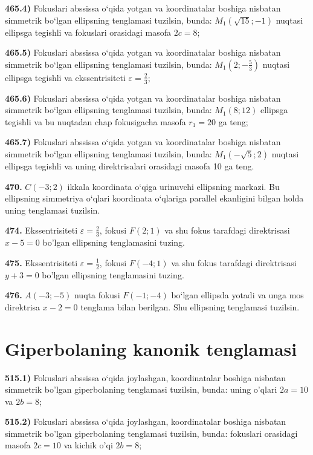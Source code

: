 \textbf{465.4)} Fokuslari abssissa o‘qida yotgan va koordinatalar boshiga nisbatan simmetrik bo‘lgan ellipsning tenglamasi tuzilsin, bunda: $M_1(\sqrt{15} ;-1)$ nuqtasi ellipsga tegishli va fokuslari orasidagi masofa $2 c=8$;

\textbf{465.5)} Fokuslari abssissa o‘qida yotgan va koordinatalar boshiga nisbatan simmetrik bo‘lgan ellipsning tenglamasi tuzilsin, bunda: $M_1\left(2 ;-\frac{5}{3}\right)$ nuqtasi ellipsga tegishli va ekssentrisiteti $\varepsilon=\frac{2}{3}$;

\textbf{465.6)} Fokuslari abssissa o‘qida yotgan va koordinatalar boshiga nisbatan simmetrik bo‘lgan ellipsning tenglamasi tuzilsin, bunda: $M_1(8 ; 12)$ ellipsga tegishli va bu nuqtadan chap fokusigacha masofa $r_1=20$ ga teng;

\textbf{465.7)} Fokuslari abssissa o‘qida yotgan va koordinatalar boshiga nisbatan simmetrik bo‘lgan ellipsning tenglamasi tuzilsin, bunda: $M_1 (-\sqrt{5}; 2) $ nuqtasi ellipsga tegishli va uning direktrisalari orasidagi masofa 10 ga teng.

\textbf{470.} $C (-3; 2) $ ikkala koordinata o‘qiga urinuvchi ellipsning markazi. Bu ellipsning simmetriya o‘qlari koordinata o‘qlariga parallel ekanligini bilgan holda uning tenglamasi tuzilsin.

\textbf{474.} Ekssentrisiteti $\varepsilon=\frac{2}{3}$, fokusi $F(2 ; 1)$ va shu fokus tarafdagi direktrisasi $x-5=0$ bo'lgan ellipsning tenglamasini tuzing.

\textbf{475.} Ekssentrisiteti $\varepsilon=\frac{1}{2}$, fokusi $F(-4 ; 1)$ va shu fokus tarafdagi direktrisasi $y+3=0$ bo'lgan ellipsning tenglamasini tuzing.

\textbf{476.} $A (-3;-5)$ nuqta fokusi $F (-1;-4)$ bo‘lgan ellipsda yotadi va unga mos direktrisa $x-2=0$ tenglama bilan berilgan. Shu ellipsning tenglamasi tuzilsin.



\section{Giperbolaning kanonik tenglamasi}



\textbf{515.1)} Fokuslari abssissa o‘qida joylashgan, koordinatalar boshiga nisbatan simmetrik bo'lgan giperbolaning tenglamasi tuzilsin, bunda: uning o'qlari $2 a=10$ va $2 b=8$;

\textbf{515.2)} Fokuslari abssissa o‘qida joylashgan, koordinatalar boshiga nisbatan simmetrik bo'lgan giperbolaning tenglamasi tuzilsin, bunda: fokuslari orasidagi masofa $2 c=10$ va kichik o'qi $2 b=8$;

